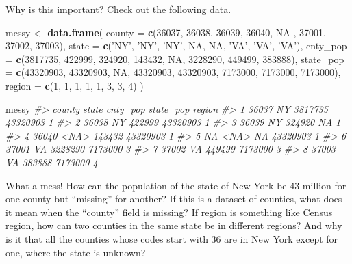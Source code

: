 \documentclass[]{book}
\newenvironment{Shaded}{\begin{snugshade}}{\end{snugshade}}
\newcommand{\KeywordTok}[1]{\textcolor[rgb]{0.13,0.29,0.53}{\textbf{#1}}}
\newcommand{\DataTypeTok}[1]{\textcolor[rgb]{0.13,0.29,0.53}{#1}}
\newcommand{\DecValTok}[1]{\textcolor[rgb]{0.00,0.00,0.81}{#1}}
\newcommand{\StringTok}[1]{\textcolor[rgb]{0.31,0.60,0.02}{#1}}
\newcommand{\CommentTok}[1]{\textcolor[rgb]{0.56,0.35,0.01}{\textit{#1}}}
\newcommand{\OtherTok}[1]{\textcolor[rgb]{0.56,0.35,0.01}{#1}}
\newcommand{\NormalTok}[1]{#1}
\begin{document}
Why is this important? Check out the following data.

\begin{Shaded}
\begin{Highlighting}[]
\NormalTok{messy <-}\StringTok{ }\KeywordTok{data.frame}\NormalTok{(}
  \DataTypeTok{county =} \KeywordTok{c}\NormalTok{(}\DecValTok{36037}\NormalTok{, }\DecValTok{36038}\NormalTok{, }\DecValTok{36039}\NormalTok{, }\DecValTok{36040}\NormalTok{, }\OtherTok{NA}\NormalTok{ , }\DecValTok{37001}\NormalTok{, }\DecValTok{37002}\NormalTok{, }\DecValTok{37003}\NormalTok{),}
  \DataTypeTok{state =} \KeywordTok{c}\NormalTok{(}\StringTok{'NY'}\NormalTok{, }\StringTok{'NY'}\NormalTok{, }\StringTok{'NY'}\NormalTok{, }\OtherTok{NA}\NormalTok{, }\OtherTok{NA}\NormalTok{, }\StringTok{'VA'}\NormalTok{, }\StringTok{'VA'}\NormalTok{, }\StringTok{'VA'}\NormalTok{),}
  \DataTypeTok{cnty_pop =} \KeywordTok{c}\NormalTok{(}\DecValTok{3817735}\NormalTok{, }\DecValTok{422999}\NormalTok{, }\DecValTok{324920}\NormalTok{, }\DecValTok{143432}\NormalTok{, }\OtherTok{NA}\NormalTok{, }\DecValTok{3228290}\NormalTok{, }\DecValTok{449499}\NormalTok{, }\DecValTok{383888}\NormalTok{),}
  \DataTypeTok{state_pop =} \KeywordTok{c}\NormalTok{(}\DecValTok{43320903}\NormalTok{, }\DecValTok{43320903}\NormalTok{, }\OtherTok{NA}\NormalTok{, }\DecValTok{43320903}\NormalTok{, }\DecValTok{43320903}\NormalTok{, }\DecValTok{7173000}\NormalTok{, }\DecValTok{7173000}\NormalTok{, }\DecValTok{7173000}\NormalTok{),}
  \DataTypeTok{region =} \KeywordTok{c}\NormalTok{(}\DecValTok{1}\NormalTok{, }\DecValTok{1}\NormalTok{, }\DecValTok{1}\NormalTok{, }\DecValTok{1}\NormalTok{, }\DecValTok{1}\NormalTok{, }\DecValTok{3}\NormalTok{, }\DecValTok{3}\NormalTok{, }\DecValTok{4}\NormalTok{)}
\NormalTok{)}

\NormalTok{messy}
\CommentTok{#>   county state cnty_pop state_pop region}
\CommentTok{#> 1  36037    NY  3817735  43320903      1}
\CommentTok{#> 2  36038    NY   422999  43320903      1}
\CommentTok{#> 3  36039    NY   324920        NA      1}
\CommentTok{#> 4  36040  <NA>   143432  43320903      1}
\CommentTok{#> 5     NA  <NA>       NA  43320903      1}
\CommentTok{#> 6  37001    VA  3228290   7173000      3}
\CommentTok{#> 7  37002    VA   449499   7173000      3}
\CommentTok{#> 8  37003    VA   383888   7173000      4}
\end{Highlighting}
\end{Shaded}

What a mess! How can the population of the state of New York be 43
million for one county but ``missing'' for another? If this is a dataset
of counties, what does it mean when the ``county'' field is missing? If
region is something like Census region, how can two counties in the same
state be in different regions? And why is it that all the counties whose
codes start with 36 are in New York except for one, where the state is
unknown?
\end{document}

